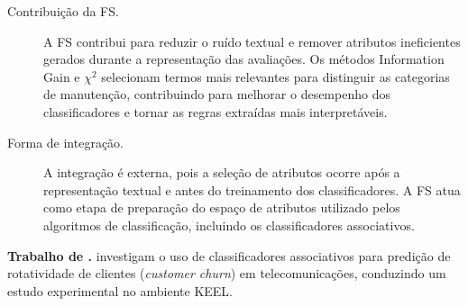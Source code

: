 \begin{description}
    \item[Contribuição da FS.] A FS contribui para reduzir o ruído textual e remover atributos ineficientes gerados durante a representação das avaliações. Os métodos Information Gain e $\chi^2$ selecionam termos mais relevantes para distinguir as categorias de manutenção, contribuindo para melhorar o desempenho dos classificadores e tornar as regras extraídas mais interpretáveis.

    \item[Forma de integração.] A integração é externa, pois a seleção de atributos ocorre após a representação textual e antes do treinamento dos classificadores. A FS atua como etapa de preparação do espaço de atributos utilizado pelos algoritmos de classificação, incluindo os classificadores associativos.
\end{description}


\textbf{Trabalho de .} 
 investigam o uso de classificadores associativos para predição de rotatividade de clientes (\textit{customer churn}) em telecomunicações, conduzindo um estudo experimental no ambiente KEEL.

